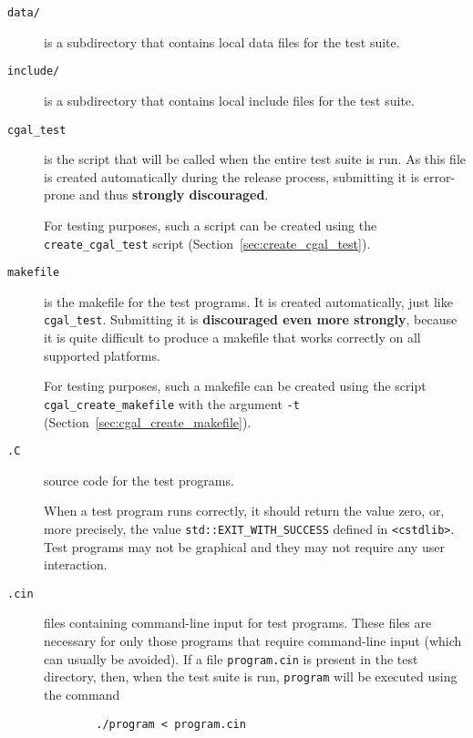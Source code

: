 \begin{description}
   \item[{\tt data/}] is a subdirectory that contains local data files for the
        test suite.
   \item[{\tt include/}] is a subdirectory that contains local include files for
        the test suite.
      \item[{\tt cgal\_test}] is the script that will be called when the entire
        test suite is run. As this file is created automatically
        during the release process, submitting it is error-prone and
        thus {\bf strongly discouraged}.
        
        For testing purposes, such a script can be created using the
        {\tt create\_cgal\_test}%
        script (Section~\ref{sec:create_cgal_test}).  

   \item[{\tt makefile}] 
        is the makefile for the test programs. It is created
        automatically, just like {\tt cgal\_test}. Submitting it is 
        {\bf discouraged even more strongly}, because it is quite difficult 
        to produce a makefile that works correctly on all supported platforms.
        
        For testing purposes, such a makefile can be created using the
        script
        {\tt cgal\_create\_makefile}%
        with the argument {\tt -t} 
        (Section~\ref{sec:cgal_create_makefile}).
   \item[{\tt *.C}] source code for the test programs.

        When a test program runs correctly, it should return
         the
        value zero, or, more precisely, the value \verb|std::EXIT_WITH_SUCCESS|
        defined in \verb|<cstdlib>|.
        Test programs may not be graphical and they may not require any user 
        interaction.   
   \item[{\tt *.cin}] files containing command-line input for 
        test programs.  These files are necessary for only those programs 
        that require command-line input (which can usually be avoided).  
        If a file \texttt{program.cin} is 
        present in the test directory, then, when the test suite is run,
        \texttt{program} will be executed using the command
        \begin{verbatim}
        ./program < program.cin
        \end{verbatim}
\end{description} 

